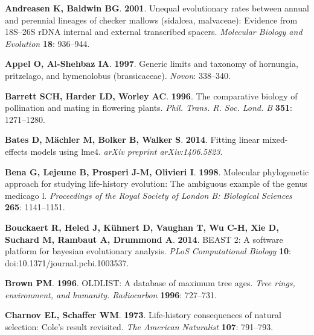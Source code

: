 \documentclass[man,floatsintext]{apa6}
\theoremstyle{definition}
\theoremstyle{definition}
\theoremstyle{definition}
\theoremstyle{remark}
\begin{document}
\leavevmode\hypertarget{ref-andreasen2001unequal}{}%
\textbf{\textnormal{Andreasen K}, \textnormal{Baldwin BG}}.
\textbf{2001}. Unequal evolutionary rates between annual and perennial
lineages of checker mallows (sidalcea, malvaceae): Evidence from
18S--26S rDNA internal and external transcribed spacers. \emph{Molecular
Biology and Evolution} \textbf{18}: 936--944.

\leavevmode\hypertarget{ref-appel1997generic}{}%
\textbf{\textnormal{Appel O}, \textnormal{Al-Shehbaz IA}}.
\textbf{1997}. Generic limits and taxonomy of hornungia, pritzelago, and
hymenolobus (brassicaceae). \emph{Novon}: 338--340.

\leavevmode\hypertarget{ref-barrett1996comparative}{}%
\textbf{\textnormal{Barrett SCH}, \textnormal{Harder LD},
\textnormal{Worley AC}}. \textbf{1996}. The comparative biology of
pollination and mating in flowering plants. \emph{Phil. Trans. R. Soc.
Lond. B} \textbf{351}: 1271--1280.

\leavevmode\hypertarget{ref-bates2014fitting}{}%
\textbf{\textnormal{Bates D}, \textnormal{Mächler M}, \textnormal{Bolker
B}, \textnormal{Walker S}}. \textbf{2014}. Fitting linear mixed-effects
models using lme4. \emph{arXiv preprint arXiv:1406.5823}.

\leavevmode\hypertarget{ref-bena1998molecular}{}%
\textbf{\textnormal{Bena G}, \textnormal{Lejeune B},
\textnormal{Prosperi J-M}, \textnormal{Olivieri I}}. \textbf{1998}.
Molecular phylogenetic approach for studying life-history evolution: The
ambiguous example of the genus medicago l. \emph{Proceedings of the
Royal Society of London B: Biological Sciences} \textbf{265}:
1141--1151.

\leavevmode\hypertarget{ref-bouckaert2014beast}{}%
\textbf{\textnormal{Bouckaert R}, \textnormal{Heled J},
\textnormal{Kühnert D}, \textnormal{Vaughan T}, \textnormal{Wu C-H},
\textnormal{Xie D}, \textnormal{Suchard M}, \textnormal{Rambaut A},
\textnormal{Drummond A}}. \textbf{2014}. BEAST 2: A software platform
for bayesian evolutionary analysis. \emph{PLoS Computational Biology}
\textbf{10}: doi:10.1371/journal.pcbi.1003537.

\leavevmode\hypertarget{ref-brown1996oldlist}{}%
\textbf{\textnormal{Brown PM}}. \textbf{1996}. OLDLIST: A database of
maximum tree ages. \emph{Tree rings, environment, and humanity.
Radiocarbon} \textbf{1996}: 727--731.

\leavevmode\hypertarget{ref-charnov1973life}{}%
\textbf{\textnormal{Charnov EL}, \textnormal{Schaffer WM}}.
\textbf{1973}. Life-history consequences of natural selection: Cole's
result revisited. \emph{The American Naturalist} \textbf{107}: 791--793.
\end{document}
